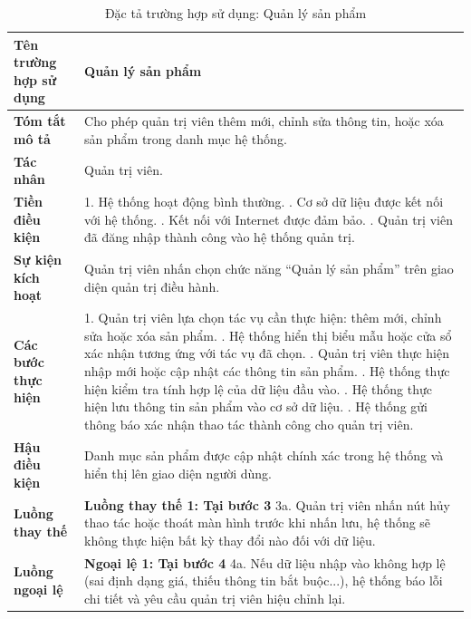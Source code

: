 \begin{longtable}{|>{\bfseries}p{4cm}|p{11.5cm}|}
\caption{Đặc tả trường hợp sử dụng: Quản lý sản phẩm}
\label{tab:uc-admin-product-management} \\
\hline
\textbf{Tên trường hợp sử dụng} & Quản lý sản phẩm \\
\hline
\textbf{Tóm tắt mô tả} & Cho phép quản trị viên thêm mới, chỉnh sửa thông tin, hoặc xóa sản phẩm trong danh mục hệ thống. \\
\hline
\textbf{Tác nhân} & Quản trị viên. \\
\hline
\textbf{Tiền điều kiện} & 1. Hệ thống hoạt động bình thường. \newline
2. Cơ sở dữ liệu được kết nối với hệ thống. \newline
3. Kết nối với Internet được đảm bảo. \newline
4. Quản trị viên đã đăng nhập thành công vào hệ thống quản trị. \\
\hline
\textbf{Sự kiện kích hoạt} & Quản trị viên nhấn chọn chức năng “Quản lý sản phẩm” trên giao diện quản trị điều hành. \\
\hline
\textbf{Các bước thực hiện} & 1. Quản trị viên lựa chọn tác vụ cần thực hiện: thêm mới, chỉnh sửa hoặc xóa sản phẩm. \newline
2. Hệ thống hiển thị biểu mẫu hoặc cửa sổ xác nhận tương ứng với tác vụ đã chọn. \newline
3. Quản trị viên thực hiện nhập mới hoặc cập nhật các thông tin sản phẩm. \newline
4. Hệ thống thực hiện kiểm tra tính hợp lệ của dữ liệu đầu vào. \newline
5. Hệ thống thực hiện lưu thông tin sản phẩm vào cơ sở dữ liệu. \newline
6. Hệ thống gửi thông báo xác nhận thao tác thành công cho quản trị viên. \\
\hline
\textbf{Hậu điều kiện} & Danh mục sản phẩm được cập nhật chính xác trong hệ thống và hiển thị lên giao diện người dùng. \\
\hline
\textbf{Luồng thay thế} & \textbf{Luồng thay thế 1: Tại bước 3} \newline
3a. Quản trị viên nhấn nút hủy thao tác hoặc thoát màn hình trước khi nhấn lưu, hệ thống sẽ không thực hiện bất kỳ thay đổi nào đối với dữ liệu. \\
\hline
\textbf{Luồng ngoại lệ} & \textbf{Ngoại lệ 1: Tại bước 4} \newline
4a. Nếu dữ liệu nhập vào không hợp lệ (sai định dạng giá, thiếu thông tin bắt buộc...), hệ thống báo lỗi chi tiết và yêu cầu quản trị viên hiệu chỉnh lại. \\
\hline
\end{longtable}

